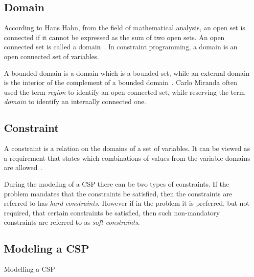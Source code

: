 \subsection{Domain}

According to Hans Hahn, from the field of mathematical analysis, an open set is connected if it cannot be expressed as the sum of two open sets. An open connected set is called a domain~\cite{hahn1921theorie}. In constraint programming, a domain is an open connected set of variables.

A bounded domain is a domain which is a bounded set, while an external domain is the interior of the complement of a bounded domain~\cite{miranda2012partial}. Carlo Miranda often used the term \textit{region} to identify an open connected set, while reserving the term \textit{domain} to identify an internally connected one.

\subsection{Constraint}

A constraint is a relation on the domains of a set of variables. It can be viewed as a requirement that states which combinations of values from the variable domains are allowed~\cite{Apt2003}.

During the modeling of a \ac{CSP} there can be two types of constraints. If the problem mandates that the constraints be satisfied, then the constraints are referred to has \textit{hard constraints}. However if in the problem it is preferred, but not required, that certain constraints be satisfied, then such non-mandatory constraints are referred to as \textit{soft constraints}.

\subsection{Modeling a \ac{CSP}}


\begin{algorithm}
    \caption{Modelling a \ac{CSP}}
    \label{modellingCSP}
    \begin{algorithmic}
        \State{}
        \State{}
        \State{}
        \State{}
        \State{}
    \end{algorithmic}
\end{algorithm}

